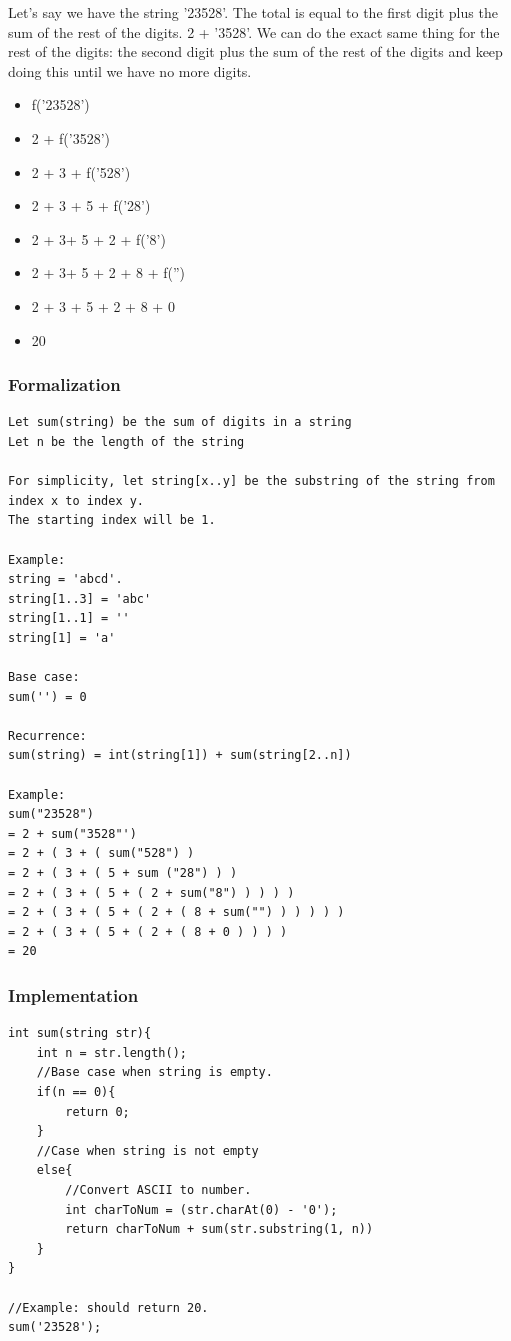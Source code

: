 \documentclass[11pt,oneside]{book}
\begin{document}
Let's say we have the string '23528'. The total is equal to the first digit plus the sum of the rest of the digits. 2 + '3528'. We can do the exact same thing for the rest of the digits: the second digit plus the sum of the rest of the digits and keep doing this until we have no more digits.

\begin{itemize}
\item f('23528')
\item 2 + f('3528')
\item 2 + 3 + f('528')
\item 2 + 3 + 5 + f('28')
\item 2 + 3+ 5 + 2 + f('8') 
\item 2 + 3+ 5 + 2 + 8 + f('')
\item 2 + 3 + 5 + 2 + 8 + 0
\item 20
\end{itemize}

\subsubsection{Formalization}

\begin{lstlisting}
Let sum(string) be the sum of digits in a string
Let n be the length of the string

For simplicity, let string[x..y] be the substring of the string from index x to index y. 
The starting index will be 1.

Example: 
string = 'abcd'.
string[1..3] = 'abc'
string[1..1] = ''
string[1] = 'a'

Base case:
sum('') = 0

Recurrence:
sum(string) = int(string[1]) + sum(string[2..n])

Example:
sum("23528")
= 2 + sum("3528"')
= 2 + ( 3 + ( sum("528") )
= 2 + ( 3 + ( 5 + sum ("28") ) )
= 2 + ( 3 + ( 5 + ( 2 + sum("8") ) ) ) )
= 2 + ( 3 + ( 5 + ( 2 + ( 8 + sum("") ) ) ) ) )
= 2 + ( 3 + ( 5 + ( 2 + ( 8 + 0 ) ) ) )
= 20
\end{lstlisting}

\subsubsection{Implementation}

\begin{lstlisting}
int sum(string str){
    int n = str.length();
    //Base case when string is empty.
    if(n == 0){
        return 0;
    }
    //Case when string is not empty
    else{
        //Convert ASCII to number.
        int charToNum = (str.charAt(0) - '0');
        return charToNum + sum(str.substring(1, n))
    }
}

//Example: should return 20.
sum('23528');
\end{lstlisting}
\end{document}
